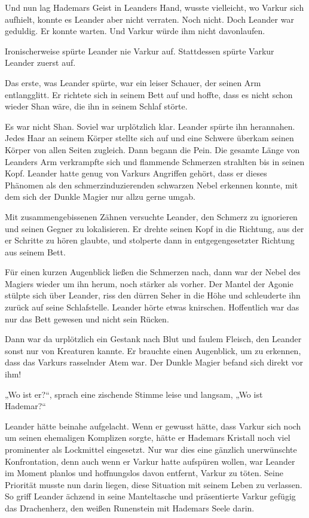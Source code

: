 Und nun lag Hademars Geist in Leanders Hand, wusste vielleicht, wo Varkur sich aufhielt, konnte es Leander aber nicht verraten. Noch nicht. Doch Leander war geduldig. Er konnte warten. Und Varkur würde ihm nicht davonlaufen.\bigskip







Ironischerweise spürte Leander nie Varkur auf. Stattdessen spürte Varkur Leander zuerst auf.

Das erste, was Leander spürte, war ein leiser Schauer, der seinen Arm entlangglitt. Er richtete sich in seinem Bett auf und hoffte, dass es nicht schon wieder Shan wäre, die ihn in seinem Schlaf störte.

Es war nicht Shan. Soviel war urplötzlich klar. Leander spürte ihn herannahen. Jedes Haar an seinem Körper stellte sich auf und eine Schwere überkam seinen Körper von allen Seiten zugleich. Dann begann die Pein. Die gesamte Länge von Leanders Arm verkrampfte sich und flammende Schmerzen strahlten bis in seinen Kopf. Leander hatte genug von Varkurs Angriffen gehört, dass er dieses Phänomen als den schmerzinduzierenden schwarzen Nebel erkennen konnte, mit dem sich der Dunkle Magier nur allzu gerne umgab.

Mit zusammengebissenen Zähnen versuchte Leander, den Schmerz zu ignorieren und seinen Gegner zu lokalisieren. Er drehte seinen Kopf in die Richtung, aus der er Schritte zu hören glaubte, und stolperte dann in entgegengesetzter Richtung aus seinem Bett.

Für einen kurzen Augenblick ließen die Schmerzen nach, dann war der Nebel des Magiers wieder um ihn herum, noch stärker als vorher. Der Mantel der Agonie stülpte sich über Leander, riss den dürren Seher in die Höhe und schleuderte ihn zurück auf seine Schlafstelle. Leander hörte etwas knirschen. Hoffentlich war das nur das Bett gewesen und nicht sein Rücken.

Dann war da urplötzlich ein Gestank nach Blut und faulem Fleisch, den Leander sonst nur von Kreaturen kannte. Er brauchte einen Augenblick, um zu erkennen, dass das Varkurs rasselnder Atem war. Der Dunkle Magier befand sich direkt vor ihm!

„Wo ist er?“, sprach eine zischende Stimme leise und langsam, „Wo ist Hademar?“

Leander hätte beinahe aufgelacht. Wenn er gewusst hätte, dass Varkur sich noch um seinen ehemaligen Komplizen sorgte, hätte er Hademars Kristall noch viel prominenter als Lockmittel eingesetzt. Nur war dies eine gänzlich unerwünschte Konfrontation, denn auch wenn er Varkur hatte aufspüren wollen, war Leander im Moment planlos und hoffnungslos davon entfernt, Varkur zu töten. Seine Priorität musste nun darin liegen, diese Situation mit seinem Leben zu verlassen. So griff Leander ächzend in seine Manteltasche und präsentierte Varkur gefügig das Drachenherz, den weißen Runenstein mit Hademars Seele darin.

